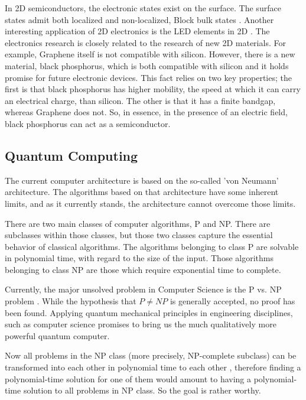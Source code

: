 In 2D semiconductors, the electronic states exist
on the surface. The surface states admit both localized and non-localized, Block bulk states \cite{LocStates}.
Another interesting application of 2D electronics is the LED elements in 2D \cite{2DLED}. The electronics research is closely related to the research of new 2D materials. For example, Graphene itself is not compatible with silicon. However, there is a new material, black phosphorus\cite{2DPhos}, which is both compatible with silicon and it holds promise for future electronic\cite{2DPhos3} devices. This fact relies on two key properties; the first is that black phosphorus has higher mobility, the speed at which it can carry an electrical charge, than silicon. The other is that it has a finite bandgap, whereas Graphene does not. So, in essence, in the presence of an electric field, black phosphorus can act as a semiconductor\cite{2DPhos2}.

\subsection*{Quantum Computing}

The current computer architecture is based on the so-called 'von Neumann' architecture. The algorithms based on that architecture have some inherent limits, and as it currently stands, the architecture cannot overcome those limits.

There are two main classes of computer algorithms, P and NP. There are subclasses within those classes, but those two classes capture the essential behavior of classical algorithms. The algorithms belonging to class P are solvable in polynomial time, with regard to the size of the input. Those algorithms belonging to class NP are those which require exponential time to complete\cite{PvsNP}.

Currently, the major unsolved problem in Computer Science is the P vs. NP problem \cite{PvsNP}. While the hypothesis that $ P \neq NP $ is generally accepted, no proof has been found. Applying quantum mechanical principles in engineering disciplines, such as computer science \cite{FQC} promises to bring us the much qualitatively more powerful quantum computer. 

 Now all problems in the NP class (more precisely, NP-complete subclass) can be transformed into each other in polynomial time to each other \cite{NPComplete},  therefore finding a polynomial-time solution for one of them would amount to having a polynomial-time solution to all problems in NP class. So the goal is rather worthy. 

